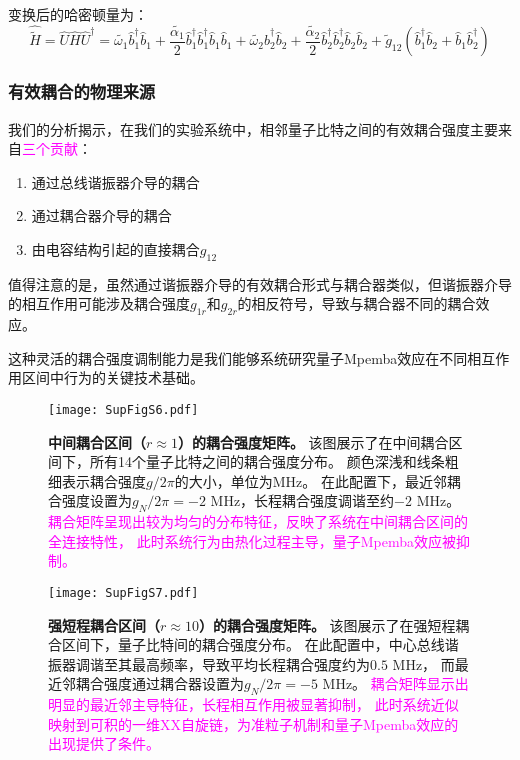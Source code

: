 \documentclass[11pt,a4paper]{article}
\begin{document}
变换后的哈密顿量为：
\[
\hat{\tilde{H}} = \hat{U}\hat{H}\hat{U}^{\dagger} = \widetilde{\omega_1}\hat{b}^{\dagger}_1\hat{b}_1 + \frac{\widetilde{\alpha_1}}{2}\hat{b}^{\dagger}_1\hat{b}^{\dagger}_1\hat{b}_1\hat{b}_1 + \widetilde{\omega_2}\hat{b}^{\dagger}_2\hat{b}_2 + \frac{\widetilde{\alpha_2}}{2}\hat{b}^{\dagger}_2\hat{b}^{\dagger}_2\hat{b}_2\hat{b}_2 + \widetilde{g}_{12}(\hat{b}^{\dagger}_1\hat{b}_2 + \hat{b}_1\hat{b}^{\dagger}_2)
\]

\subsubsection{有效耦合的物理来源}

我们的分析揭示，在我们的实验系统中，相邻量子比特之间的有效耦合强度主要来自\textcolor{magenta}{三个贡献}：
\begin{enumerate}
    \item 通过总线谐振器介导的耦合
    \item 通过耦合器介导的耦合
    \item 由电容结构引起的直接耦合$g_{12}$
\end{enumerate}

值得注意的是，虽然通过谐振器介导的有效耦合形式与耦合器类似，但谐振器介导的相互作用可能涉及耦合强度$g_{1r}$和$g_{2r}$的相反符号，导致与耦合器不同的耦合效应。

这种灵活的耦合强度调制能力是我们能够系统研究量子Mpemba效应在不同相互作用区间中行为的关键技术基础。


\begin{figure}[H]
    \centering
    \texttt{[image: SupFigS6.pdf]}
    \caption{
        \textbf{中间耦合区间（$r \approx 1$）的耦合强度矩阵。}
        该图展示了在中间耦合区间下，所有14个量子比特之间的耦合强度分布。
        颜色深浅和线条粗细表示耦合强度$g/2\pi$的大小，单位为MHz。
        在此配置下，最近邻耦合强度设置为$g_N/2\pi = -2$ MHz，长程耦合强度调谐至约$-2$ MHz。
        \textcolor{magenta}{耦合矩阵呈现出较为均匀的分布特征，反映了系统在中间耦合区间的全连接特性，
        此时系统行为由热化过程主导，量子Mpemba效应被抑制。}
    }
    \label{fig:coupling_matrix_intermediate}
\end{figure}

\begin{figure}[H]
    \centering
    \texttt{[image: SupFigS7.pdf]}
    \caption{
        \textbf{强短程耦合区间（$r \approx 10$）的耦合强度矩阵。}
        该图展示了在强短程耦合区间下，量子比特间的耦合强度分布。
        在此配置中，中心总线谐振器调谐至其最高频率，导致平均长程耦合强度约为$0.5$ MHz，
        而最近邻耦合强度通过耦合器设置为$g_N/2\pi = -5$ MHz。
        \textcolor{magenta}{耦合矩阵显示出明显的最近邻主导特征，长程相互作用被显著抑制，
        此时系统近似映射到可积的一维XX自旋链，为准粒子机制和量子Mpemba效应的出现提供了条件。}
    }
    \label{fig:coupling_matrix_strong_short_range}
\end{figure}
\end{document}
